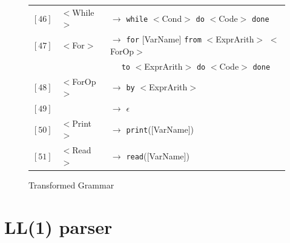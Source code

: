 \documentclass[letterpaper]{article}
\begin{document}
{\begin{figure}[H]
\begin{tabular}{r l l}
        $[46]$ & $<$While$>$ & $\rightarrow$
        \texttt{while} $<$Cond$>$ \texttt{do}
        $<$Code$>$ \texttt{done} \\
        $[47]$ & $<$For$>$ & $\rightarrow$
        \texttt{for} [VarName] \texttt{from}
        $<$ExprArith$>$ $<$ForOp$>$ \\
        & &
        $\quad$ \texttt{to} $<$ExprArith$>$
        \texttt{do} $<$Code$>$ \texttt{done} \\
        $[48]$ & $<$ForOp$>$ & $\rightarrow$
        \texttt{by} $<$ExprArith$>$ \\
        $[49]$ & & $\rightarrow$ $\epsilon$ \\
        $[50]$ & $<$Print$>$ & $\rightarrow$
        \texttt{print}([VarName]) \\
        $[51]$ & $<$Read$>$ & $\rightarrow$ \texttt{read}([VarName]) \\
    \end{tabular}
    \caption{Transformed Grammar}
    \label{fig:fullcfg}
\end{figure}
\clearpage
\restoregeometry
}

\section{LL(1) parser}
\end{document}
